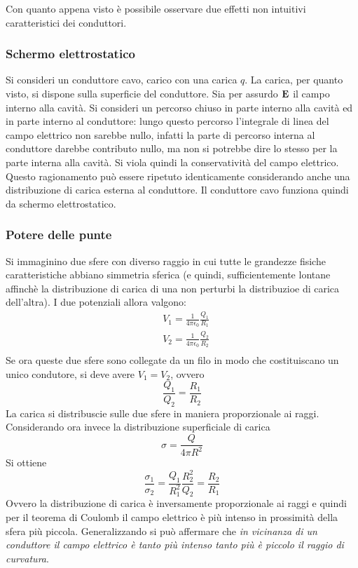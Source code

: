 Con quanto appena visto è possibile osservare due effetti non intuitivi caratteristici dei conduttori.

\subsubsection{Schermo elettrostatico}
Si consideri un conduttore cavo, carico con una carica $q$. La carica, per quanto visto, si dispone sulla superficie
del conduttore. Sia per assurdo $\vb{E}$ il campo interno alla cavità. Si consideri un percorso chiuso in parte interno
alla cavità ed in parte interno al conduttore: lungo questo percorso l'integrale di linea del campo elettrico non
sarebbe nullo, infatti la parte di percorso interna al conduttore darebbe contributo nullo, ma non si potrebbe dire
lo stesso per la parte interna alla cavità. Si viola quindi la conservatività del campo elettrico. Questo ragionamento
può essere ripetuto identicamente considerando anche una distribuzione di carica esterna al conduttore. Il conduttore
cavo funziona quindi da schermo elettrostatico.

\subsubsection{Potere delle punte}
Si immaginino due sfere con diverso raggio in cui tutte le grandezze fisiche caratteristiche abbiano simmetria sferica
(e quindi, sufficientemente lontane affinchè la distribuzione di carica di una non perturbi la distribuzioe di carica
dell'altra). I due potenziali allora valgono:
\[
    \begin{split}
        & V_1=\frac{1}{4\pi\epsilon_0}\frac{Q_1}{R_1}\\
        & V_2=\frac{1}{4\pi\epsilon_0}\frac{Q_2}{R_2}\\
    \end{split}
\]
Se ora queste due sfere sono collegate da un filo in modo che costituiscano un unico condutore, si deve avere $V_1=V_2$, ovvero
\[
    \frac{Q_1}{Q_2}=\frac{R_1}{R_2}
\]
La carica si distribuscie sulle due sfere in maniera proporzionale ai raggi.
Considerando ora invece la distribuzione superficiale di carica
\[
    \sigma=\frac{Q}{4\pi R^2}
\]
Si ottiene
\[
    \frac{\sigma_1}{\sigma_2}=\frac{Q_1}{R_1^2}\frac{R_2^2}{Q_2}=\frac{R_2}{R_1}
\]
Ovvero la distribuzione di carica è inversamente proporzionale ai raggi e quindi per il teorema di Coulomb il campo
elettrico è più intenso in prossimità della sfera più piccola. Generalizzando si può affermare che \textit{in vicinanza
di un conduttore il campo elettrico è tanto più intenso tanto più è piccolo il raggio di curvatura}.
